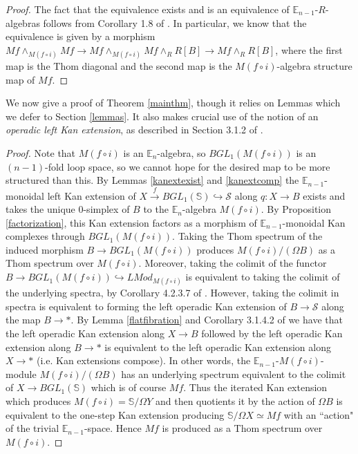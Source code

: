 \documentclass{article}
\theoremstyle{definition}
\theoremstyle{plain}
\renewcommand{\S}{\mathcal{S}}
\newcommand{\sph}{\mathbb{S}}
\newcommand{\E}{\mathbb{E}}
\begin{document}
\begin{proof}
The fact that the equivalence exists and is an equivalence of $\E_{n-1}$-$R$-algebras follows from Corollary 1.8 of \cite{abg}. In particular, we know that the equivalence is given by a morphism $Mf\wedge_{M(f\circ i)} Mf\to Mf\wedge_{M(f\circ i)}Mf\wedge_R R[B]\to Mf\wedge_R R[B]$, where the first map is the Thom diagonal and the second map is the $M(f\circ i)$-algebra structure map of $Mf$.
\end{proof}


We now give a proof of Theorem \ref{mainthm}, though it relies on Lemmas which we defer to Section \ref{lemmas}. It also makes crucial use of the notion of an \emph{operadic left Kan extension}, as described in Section 3.1.2 of \cite{ha}.

\begin{proof}
Note that $M(f\circ i)$ is an $\E_n$-algebra, so $BGL_1(M(f\circ i))$ is an $(n-1)$-fold loop space, so we cannot hope for the desired map to be more structured than this. By Lemmas \ref{kanextexist} and \ref{kanextcomp} the $\E_{n-1}$-monoidal left Kan extension of $X\overset{f}\to BGL_1(\sph)\hookrightarrow \S$ along $q\colon X\to B$ exists and takes the unique 0-simplex of $B$ to the $\E_n$-algebra $M(f\circ i)$. By Proposition \ref{factorization}, this Kan extension factors as a morphism of $\E_{n-1}$-monoidal Kan complexes through $BGL_1(M(f\circ i))$. Taking the Thom spectrum of the induced morphism $B\to BGL_1(M(f\circ i))$ produces $M(f\circ i)/(\Omega B)$ as a Thom spectrum over $M(f\circ i)$. Moreover, taking the colimit of the functor $B\to BGL_1(M(f\circ i))\hookrightarrow LMod_{M(f\circ i)}$ is equivalent to taking the colimit of the underlying spectra, by Corollary 4.2.3.7 of \cite{ha}. However, taking the colimit in spectra is equivalent to forming the left operadic Kan extension of $B\to\S$ along the map $B\to \ast$. By Lemma \ref{flatfibration} and Corollary 3.1.4.2 of \cite{ha} we have that the left operadic Kan extension along $X\to B$ followed by the left operadic Kan extension along $B\to \ast$ is equivalent to the left operadic Kan extension along $X\to \ast$ (i.e. Kan extensions compose). In other words, the $\E_{n-1}$-$M(f\circ i)$-module $M(f\circ i)/(\Omega B)$ has an underlying spectrum equivalent to the colimit of $X\to BGL_1(\sph)$ which is of course $Mf$. Thus the iterated Kan extension which produces $M(f\circ i)=\sph/\Omega Y$ and then quotients it by the action of $\Omega B$ is equivalent to the one-step Kan extension producing $\sph/\Omega X\simeq Mf$ with an ``action" of the trivial $\E_{n-1}$-space. Hence $Mf$ is produced as a Thom spectrum over $M(f\circ i)$. 
\end{proof}
\end{document}
